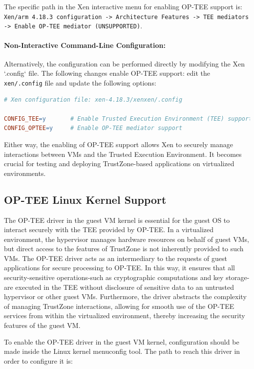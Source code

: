 \documentclass[acmtog]{acmart}
\begin{document}
The specific path in the Xen interactive menu for enabling OP-TEE support is:
\texttt{Xen/arm 4.18.3 configuration -> Architecture Features -> TEE mediators -> Enable OP-TEE mediator (UNSUPPORTED)}.

\paragraph{Non-Interactive Command-Line Configuration:}
Alternatively, the configuration can be performed directly by modifying the Xen `.config` file. The following changes enable OP-TEE support: edit the \texttt{xen/.config} file and update the following options:

\begin{lstlisting}[language=make, caption=Enable OP-TEE Support in Xen Configuration]
# Xen configuration file: xen-4.18.3/xenxen/.config

CONFIG_TEE=y       # Enable Trusted Execution Environment (TEE) support
CONFIG_OPTEE=y     # Enable OP-TEE mediator support
\end{lstlisting}


Either way, the enabling of OP-TEE support allows Xen to securely manage interactions between VMs and the Trusted Execution Environment. It becomes crucial for testing and deploying TrustZone-based applications on virtualized environments.


\subsection{OP-TEE Linux Kernel Support}
The OP-TEE driver in the guest VM kernel is essential for the guest OS to interact securely with the TEE provided by OP-TEE. In a virtualized environment, the hypervisor manages hardware resources on behalf of guest VMs, but direct access to the features of TrustZone is not inherently provided to such VMs. The OP-TEE driver acts as an intermediary to the requests of guest applications for secure processing to OP-TEE. In this way, it ensures that all security-sensitive operations-such as cryptographic computations and key storage-are executed in the TEE without disclosure of sensitive data to an untrusted hypervisor or other guest VMs. Furthermore, the driver abstracts the complexity of managing TrustZone interactions, allowing for smooth use of the OP-TEE services from within the virtualized environment, thereby increasing the security features of the guest VM.

To enable the OP-TEE driver in the guest VM kernel, configuration should be made inside the Linux kernel menuconfig tool. The path to reach this driver in order to configure it is:
\end{document}
